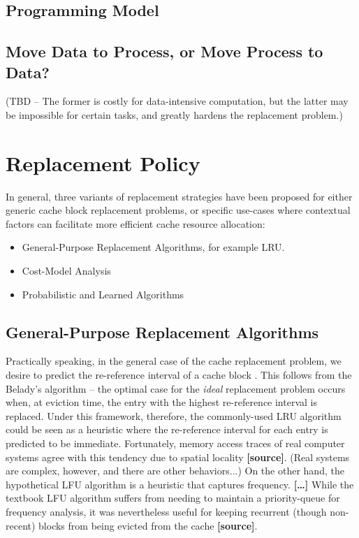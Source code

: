 \documentclass{article}
\begin{document}
\subsection{Programming Model}

\subsection{Move Data to Process, or Move Process to Data?}
(TBD -- The former is costly for data-intensive computation, but the latter may
be impossible for certain tasks, and greatly hardens the replacement problem.)

\section{Replacement Policy}

In general, three variants of replacement strategies have been proposed for either
generic cache block replacement problems, or specific use-cases where contextual
factors can facilitate more efficient cache resource allocation:
\begin{itemize}
    \item General-Purpose Replacement Algorithms, for example LRU.
    \item Cost-Model Analysis
    \item Probabilistic and Learned Algorithms
\end{itemize}

\subsection{General-Purpose Replacement Algorithms}
Practically speaking, in the general case of the cache replacement problem,
we desire to predict the re-reference interval of a cache block
\cite{Jaleel_etal.RRIP.2010}. This follows from the Belady's algorithm -- the
optimal case for the \emph{ideal} replacement problem occurs when, at eviction
time, the entry with the highest re-reference interval is replaced. Under this
framework, therefore, the commonly-used LRU algorithm could be seen as a heuristic
where the re-reference interval for each entry is predicted to be immediate.
Fortunately, memory access traces of real computer systems agree with this
tendency due to spatial locality \textbf{[source]}. (Real systems are complex,
however, and there are other behaviors...) On the other hand, the hypothetical
LFU algorithm is a heuristic that captures frequency. \textbf{[\dots]} While the
textbook LFU algorithm suffers from needing to maintain a priority-queue for
frequency analysis, it was nevertheless useful for keeping recurrent (though
non-recent) blocks from being evicted from the cache \textbf{[source]}.
\end{document}
